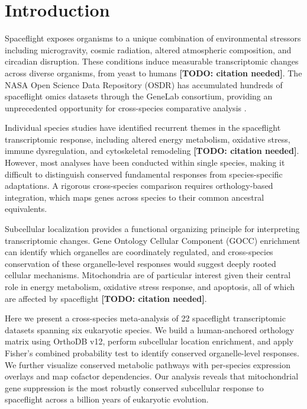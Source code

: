 \documentclass[pdflatex,sn-nature]{sn-jnl}
\begin{document}
\section{Introduction}\label{sec:intro}

Spaceflight exposes organisms to a unique combination of environmental stressors
including microgravity, cosmic radiation, altered atmospheric composition, and
circadian disruption. These conditions induce measurable transcriptomic changes
across diverse organisms, from yeast to humans \textbf{[TODO: citation needed]}.
The NASA Open Science Data Repository (OSDR) has accumulated hundreds of
spaceflight omics datasets through the GeneLab consortium, providing an
unprecedented opportunity for cross-species comparative analysis \cite{ray2019}.

Individual species studies have identified recurrent themes in the spaceflight
transcriptomic response, including altered energy metabolism, oxidative stress,
immune dysregulation, and cytoskeletal remodeling \textbf{[TODO: citation needed]}.
However, most analyses have been conducted within single species, making it
difficult to distinguish conserved fundamental responses from species-specific
adaptations. A rigorous cross-species comparison requires orthology-based
integration, which maps genes across species to their common ancestral
equivalents.

Subcellular localization provides a functional organizing principle for
interpreting transcriptomic changes. Gene Ontology Cellular Component (GOCC)
enrichment can identify which organelles are coordinately regulated, and
cross-species conservation of these organelle-level responses would suggest
deeply rooted cellular mechanisms. Mitochondria are of particular interest given
their central role in energy metabolism, oxidative stress response, and
apoptosis, all of which are affected by spaceflight \textbf{[TODO: citation needed]}.

Here we present a cross-species meta-analysis of 22 spaceflight transcriptomic
datasets spanning six eukaryotic species. We build a human-anchored orthology
matrix using OrthoDB v12, perform subcellular location enrichment, and apply
Fisher's combined probability test to identify conserved organelle-level
responses. We further visualize conserved metabolic pathways with per-species
expression overlays and map cofactor dependencies. Our analysis reveals that
mitochondrial gene suppression is the most robustly conserved subcellular
response to spaceflight across a billion years of eukaryotic evolution.
\end{document}
